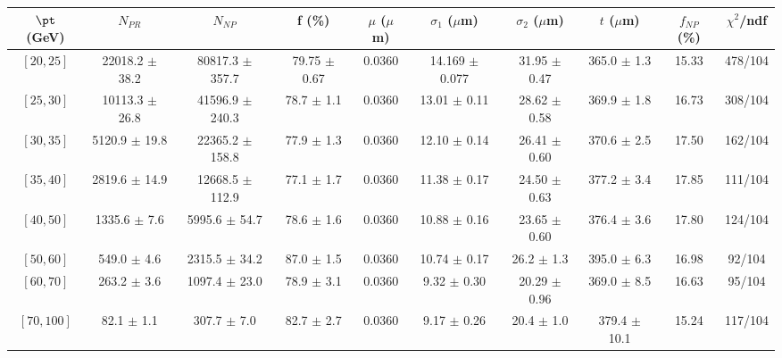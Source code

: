 \begin{tabular}{c||c|c|c|c|c|c|c||c|c}
$\pt$ (GeV) & $N_{PR}$ & $N_{NP}$ & f (\%) & $\mu$ ($\mu$m) & $\sigma_1$ ($\mu$m) & $\sigma_2$ ($\mu$m)  & $t$ ($\mu$m) & $f_{NP}$ (\%) & $\chi^2$/ndf \\
\hline
$[20, 25]$ & 22018.2 $\pm$ 38.2 & 80817.3 $\pm$ 357.7 & 79.75 $\pm$ 0.67 & 0.0360 & 14.169 $\pm$ 0.077 & 31.95 $\pm$ 0.47 & 365.0 $\pm$ 1.3 & 15.33 & 478/104\\
$[25, 30]$ & 10113.3 $\pm$ 26.8 & 41596.9 $\pm$ 240.3 & 78.7 $\pm$ 1.1 & 0.0360 & 13.01 $\pm$ 0.11 & 28.62 $\pm$ 0.58 & 369.9 $\pm$ 1.8 & 16.73 & 308/104\\
$[30, 35]$ & 5120.9 $\pm$ 19.8 & 22365.2 $\pm$ 158.8 & 77.9 $\pm$ 1.3 & 0.0360 & 12.10 $\pm$ 0.14 & 26.41 $\pm$ 0.60 & 370.6 $\pm$ 2.5 & 17.50 & 162/104\\
$[35, 40]$ & 2819.6 $\pm$ 14.9 & 12668.5 $\pm$ 112.9 & 77.1 $\pm$ 1.7 & 0.0360 & 11.38 $\pm$ 0.17 & 24.50 $\pm$ 0.63 & 377.2 $\pm$ 3.4 & 17.85 & 111/104\\
$[40, 50]$ & 1335.6 $\pm$ 7.6 & 5995.6 $\pm$ 54.7 & 78.6 $\pm$ 1.6 & 0.0360 & 10.88 $\pm$ 0.16 & 23.65 $\pm$ 0.60 & 376.4 $\pm$ 3.6 & 17.80 & 124/104\\
$[50, 60]$ & 549.0 $\pm$ 4.6 & 2315.5 $\pm$ 34.2 & 87.0 $\pm$ 1.5 & 0.0360 & 10.74 $\pm$ 0.17 & 26.2 $\pm$ 1.3 & 395.0 $\pm$ 6.3 & 16.98 & 92/104\\
$[60, 70]$ & 263.2 $\pm$ 3.6 & 1097.4 $\pm$ 23.0 & 78.9 $\pm$ 3.1 & 0.0360 & 9.32 $\pm$ 0.30 & 20.29 $\pm$ 0.96 & 369.0 $\pm$ 8.5 & 16.63 & 95/104\\
$[70, 100]$ & 82.1 $\pm$ 1.1 & 307.7 $\pm$ 7.0 & 82.7 $\pm$ 2.7 & 0.0360 & 9.17 $\pm$ 0.26 & 20.4 $\pm$ 1.0 & 379.4 $\pm$ 10.1 & 15.24 & 117/104\\
\end{tabular}

